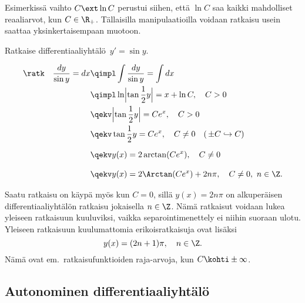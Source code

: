 Esimerkissä vaihto $C\ext\ln C$ perustui siihen, että $\ln C$ saa kaikki mahdolliset
reaaliarvot, kun $C\in\R_+$. Tällaisilla manipulaatioilla voidaan ratkaisu usein saattaa
yksinkertaisempaan muotoon.
\begin{Exa} \label{muuan separoituva dy}
Ratkaise differentiaaliyhtälö $\,y'=\sin y$.
\end{Exa}
\begin{align*}
\text{\ratk}\quad \frac{dy}{\sin y} = dx 
                       &\qimpl \int\frac{dy}{\sin y} = \int dx \\
                       &\qimpl \ln\Bigl|\tan\frac{1}{2}y\Bigr| = x +\ln C,\quad C>0 \\
                       &\qekv \Bigl|\tan\frac{1}{2}y\Bigr| = Ce^x,\quad C>0 \\
                       &\qekv \tan\frac{1}{2} y = Ce^x,\quad C\neq 0 \quad 
                                                       (\,\pm C \hookrightarrow C) \\[2mm]
                       &\qekv y(x) = 2\arctan(Ce^x), \quad C \neq 0 \\[3mm]
                       &\qekv y(x) = 2\Arctan(Ce^x)+2n\pi, \quad C \neq 0,\ n\in\Z.
\end{align*}

Saatu ratkaisu on käypä myös kun $C=0$, sillä $y(x)=2n\pi$ on alkuperäisen
differentiaaliyhtälön ratkaisu jokaisella $n\in\Z$. Nämä ratkaisut voidaan lukea yleiseen
ratkaisuun kuuluviksi, vaikka separointimenettely ei niihin suoraan ulotu. Yleiseen ratkaisuun
kuulumattomia erikoisratkaisuja ovat lisäksi
\[
y(x)=(2n+1)\pi, \quad n\in\Z.
\]
Nämä ovat em.\ ratkaisufunktioiden raja-arvoja, kun $C\kohti\pm\infty$.
\loppu

\subsection*{Autonominen differentiaaliyhtälö}

